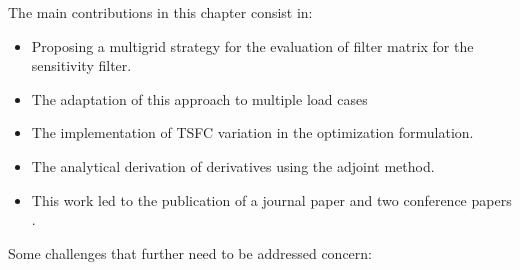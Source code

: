The main contributions in this chapter consist in:
\begin{itemize}
\item Proposing a multigrid strategy for the evaluation of filter matrix for the sensitivity filter. 
\item The adaptation of this approach to multiple load cases
\item The implementation of TSFC variation in the optimization formulation.
\item The analytical derivation of derivatives using the adjoint method.
\item This work led to the publication of a journal paper \cite{coniglio2019enginepylon} and two conference papers \cite{coniglio2017pylon,coniglio2018original}.
\end{itemize}
Some challenges that further need to be addressed concern:
